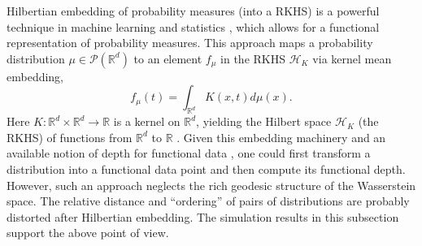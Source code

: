 \documentclass{imsart}
\numberwithin{equation}{section}
\def\R{\mathbb{R}}
\begin{document}
Hilbertian embedding of probability measures (into a RKHS) is a powerful technique in machine learning and statistics  \citep{sriperumbudur2010hilbert}, which allows for a functional representation of probability measures. 
This approach maps a probability distribution $\mu \in \mathcal{P}(\R^d)$ to an element $f_{\mu}$ in the RKHS $\mathcal{H}_K$ via kernel mean embedding, 
\begin{equation*}
	f_{\mu}(t) = \int_{\R^d} K(x,t) d\mu(x).
\end{equation*}
Here $K : \R^d \times \R^d \to \R$ is a kernel on $\R^d$, yielding the Hilbert space $\mathcal{H}_K$ (the RKHS) of functions from $\R^d$ to $\R$ \cite{berlinet2011reproducing}. 
Given this embedding machinery and an available notion of depth for functional data \citep{fraiman2001trimmed, lopez2009concept}, one could first transform a distribution into a functional data point and then compute its functional depth. However, such an approach neglects the rich geodesic structure of the Wasserstein space. The relative distance and ``ordering'' of pairs of distributions are probably distorted after Hilbertian embedding. The simulation results in this subsection support the above point of view. 
\end{document}
